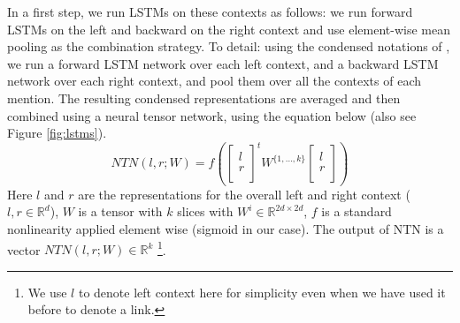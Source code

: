 \documentclass[letterpaper]{article} \usepackage{aaai18}  \usepackage{times}  \usepackage{helvet}  \usepackage{courier}  \usepackage{url}  \usepackage{graphicx}  \frenchspacing  \setlength{\pdfpagewidth}{8.5in}  \setlength{\pdfpageheight}{11in}  \usepackage{latexsym}
\begin{document}
In a first step, we run LSTMs on these contexts as follows: we run forward LSTMs on the left and backward on the right context and use element-wise mean pooling as the combination strategy. To detail: 
using the condensed notations of \cite{DBLP:journals/corr/ChengDL16}, we run a forward LSTM network over each left context, and a backward LSTM network over each right context, and pool them over all the contexts of each mention. The resulting condensed representations are averaged and then combined using a neural tensor network, using the equation below (also see Figure \ref{fig:lstms}).
\begin{equation}
NTN(l,r;W) = f(\left[ \begin{array}{c}l \\ r \\\end{array}\right]^t W^{\{1,\ldots,k\}}\left[ \begin{array}{c}l \\ r \\\end{array}\right])
\label{eq:NTN}
\end{equation}
Here $l$ and $r$ are the representations for the overall left and right context ($l,r \in \mathbb{R}^d$), $W$ is a tensor with $k$ slices with $W^i \in \mathbb{R}^{2d \times 2d}$, $f$ is a standard nonlinearity applied element wise (sigmoid in our case). The output of NTN is a vector $NTN(l, r;W) \in \mathbb{R}^k$ \footnote{We use $l$ to denote left context here for simplicity even when we have used it before to denote a link.}.
\end{document}
